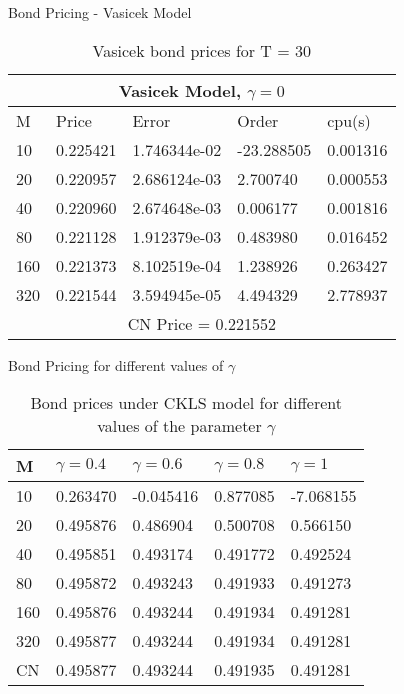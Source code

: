 \documentclass{beamer}
\begin{document}
 
\begin{frame}{Bond Pricing - Vasicek Model}
    \begin{table}[htp]
    \begin{tabular}{ |p{1cm}|p{1.7cm}|p{2.5cm}|p{2cm}|p{1.5cm}|  }
    
     \hline
        \multicolumn{5}{|c|}{Vasicek Model, $\gamma = 0$} \\
     \hline
     M & Price & Error & Order & cpu(s)\\
     \hline
    10 & 0.225421 & 1.746344e-02 &  -23.288505 & 0.001316\\
    20 & 0.220957 & 2.686124e-03 &  2.700740 & 0.000553\\
    40 & 0.220960 & 2.674648e-03 &  0.006177 & 0.001816\\
    80 & 0.221128 & 1.912379e-03 &  0.483980 & 0.016452\\
    160 & 0.221373 & 8.102519e-04 &  1.238926 & 0.263427\\
    320 & 0.221544 & 3.594945e-05 &  4.494329 & 2.778937\\
     \hline
     \multicolumn{5}{|c|}{CN Price = 0.221552} \\
     \hline
     
    \end{tabular}
    \caption{ Vasicek bond prices for T = 30}
        
    \end{table}
\end{frame}


\begin{frame}{Bond Pricing for different values of $\gamma$}
    \begin{table}[htp]
    \begin{tabular}{ |p{1cm}|p{2cm}|p{2cm}|p{2cm}|p{2cm}|  }
    
     \hline
     M & $\gamma = 0.4$ & $\gamma = 0.6$ & $\gamma = 0.8$ & $\gamma = 1$\\
     \hline
    10 & 0.263470 & -0.045416 &  0.877085 & -7.068155\\
    20 & 0.495876 & 0.486904 & 0.500708 & 0.566150\\
    40 & 0.495851 & 0.493174 & 0.491772 & 0.492524\\
    80 & 0.495872 & 0.493243 & 0.491933 & 0.491273\\
    160 & 0.495876  & 0.493244 & 0.491934 & 0.491281\\
    320 & 0.495877  & 0.493244  & 0.491934 & 0.491281\\
     \hline
     CN & 0.495877 & 0.493244 & 0.491935 & 0.491281\\
     \hline
     
    \end{tabular}
    \caption{ Bond prices under CKLS model for different values of the parameter $\gamma$ }
    
    \end{table}
\end{frame}
 
\end{document}
